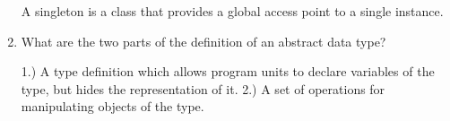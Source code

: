 \begin{enumerate}
 \begin{answer}

    A singleton is a class that provides a global access point to a single instance.

    \end{answer}

  \item What are the two parts of the definition 
    of an abstract data type?

 \begin{answer}

    1.) A type definition which allows program units to declare variables of the 
type, but hides the representation of it.
    2.) A set of operations for manipulating objects of the type.

    \end{answer}

  \end{enumerate}


